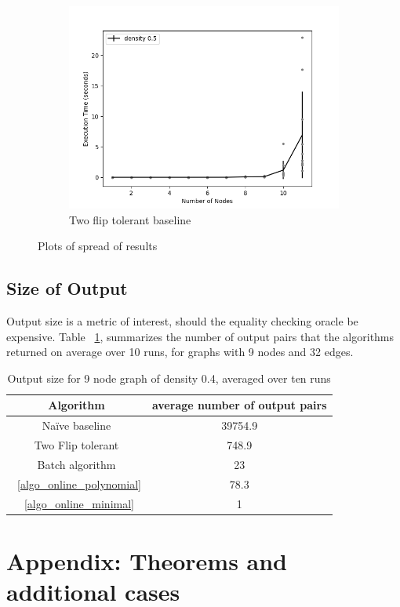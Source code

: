\documentclass[sigplan,review,anonymous]{acmart}
\begin{document}
{\begin{figure}
    \begin{subfigure}{0.5\linewidth}
      \includegraphics[width=.8\linewidth]{variance_10_TwoFlip.png}
      \caption{Two flip tolerant baseline}
      \label{fig:sfigTwoFlipSpread}
    \end{subfigure}

    \caption{Plots of spread of results}
    \label{fig:variance}
\end{figure}

\subsection{Size of Output}
Output size is a metric of interest, should the equality checking oracle be expensive.
Table ~\ref{tab:sizes}, summarizes the number of output pairs that the algorithms returned on average over 10 runs, for graphs with 9 nodes and 32 edges.
\begin{table}
\begin{tabular}{|c|c|}
    \hline
    Algorithm & average number of output pairs \\
    \hline
    Na\"{i}ve baseline & 39754.9 \\
    Two Flip tolerant & 748.9 \\
    Batch algorithm & 23 \\
    ~\ref{algo_online_polynomial} & 78.3 \\
    ~\ref{algo_online_minimal} & 1 \\
    \hline
\end{tabular}
\caption{Output size for 9 node graph of density 0.4, averaged over ten runs}
\label{tab:sizes}
\end{table}

\section{Appendix: Theorems and additional cases}

}
\end{document}

